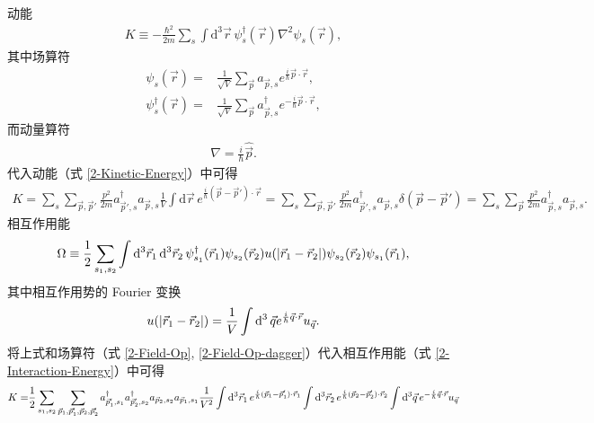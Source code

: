 \documentclass{assignment}
\begin{document}
\begin{pf}
    动能
    \begin{align}
        K\equiv-\frac{\hbar^2}{2m}\sum_s\int\mathrm{d}^3\vec{r}\,\psi_s^{\dagger}(\vec{r})\nabla^2\psi_s(\vec{r}),
    \end{align}
    其中场算符
    \begin{align}
        \label{2-Field-Op}
        \psi_s(\vec{r})=&\frac{1}{\sqrt{V}}\sum_{\vec{p}}a_{\vec{p},s}e^{\frac{i}{\hbar}\vec{p}\cdot\vec{r}},\\
        \label{2-Field-Op-dagger}
        \psi_s^{\dagger}(\vec{r})=&\frac{1}{\sqrt{V}}\sum_{\vec{p}}a_{\vec{p},s}^{\dagger}e^{-\frac{i}{\hbar}\vec{p}\cdot\vec{r}},
    \end{align}
    而动量算符
    \begin{align}
        \nabla=\frac{i}{\hbar}\hat{\vec{p}}.
    \end{align}
    代入动能（式 \eqref{2-Kinetic-Energy}）中可得
    \begin{align}
        K=\sum_s\sum_{\vec{p},\vec{p}'}\frac{p^2}{2m}a_{\vec{p}',s}^{\dagger}a_{\vec{p},s}\frac{1}{V}\int\mathrm{d}\vec{r}\,e^{\frac{i}{\hbar}(\vec{p}-\vec{p}')\cdot\vec{r}}=\sum_s\sum_{\vec{p},\vec{p}'}\frac{p^2}{2m}a_{\vec{p}',s}^{\dagger}a_{\vec{p},s}\delta(\vec{p}-\vec{p}')=\sum_s\sum_{\vec{p}}\frac{p^2}{2m}a_{\vec{p},s}^{\dagger}a_{\vec{p},s}.
    \end{align}
    相互作用能
    \begin{align}
        \label{2-Interaction-Energy}
        \Omega\equiv\frac{1}{2}\sum_{s_1,s_2}\int\mathrm{d}^3\vec{r}_1\,\mathrm{d}^3\vec{r}_2\,\psi_{s_1}^{\dagger}(\vec{r}_1)\psi_{s_2}(\vec{r}_2)u(\left\lvert\vec{r}_1-\vec{r}_2\right\rvert)\psi_{s_2}(\vec{r}_2)\psi_{s_1}(\vec{r}_1),
    \end{align}
    其中相互作用势的 Fourier 变换
    \begin{align}
        u(\left\lvert\vec{r}_1-\vec{r}_2\right\rvert)=\frac{1}{V}\int\mathrm{d}^3\,\vec{q}e^{\frac{i}{\hbar}\vec{q}\cdot\vec{r}}u_{\vec{q}}.
    \end{align}
    将上式和场算符（式 \eqref{2-Field-Op}, \eqref{2-Field-Op-dagger}）代入相互作用能（式 \eqref{2-Interaction-Energy}）中可得
    \begin{align}
        \notag K=&\frac{1}{2}\sum_{s_1,s_2}\sum_{\vec{p}_1,\vec{p}_1',\vec{p}_2,\vec{p}_2'}a_{\vec{p}_1',s_1}^{\dagger}a_{\vec{p}_2',s_2}^{\dagger}a_{\vec{p}_2,s_2}a_{\vec{p}_1,s_1}\frac{1}{V^2}\int\mathrm{d}^3\vec{r}_1\,e^{\frac{i}{\hbar}(\vec{p}_1-\vec{p}_1')\cdot\vec{r}_1}\int\mathrm{d}^3\vec{r}_2\,e^{\frac{i}{\hbar}(\vec{p}_2-\vec{p}_2')\cdot\vec{r}_2}\int\mathrm{d}^3\vec{q}\,e^{-\frac{i}{\hbar}\vec{q}\cdot\vec{r}}u_{\vec{q}}\\

\end{align}
\end{pf}
\end{document}
